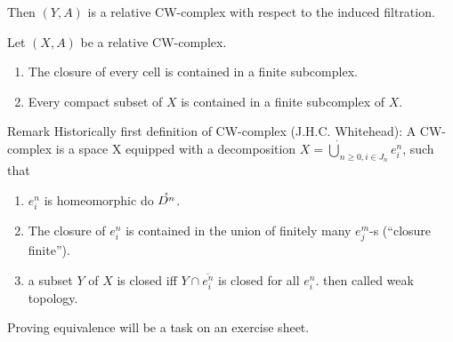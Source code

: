 \documentclass{TemplateLecture}
\begin{document}
Then \((Y,A)\) is a relative CW-complex with respect to the induced filtration.

\begin{thm}{}{}
    Let \((X,A)\) be a relative CW-complex.
    \begin{enumerate}
        \item The closure of every cell is contained in a finite subcomplex.
        \item Every compact subset of \(X\) is contained in a finite subcomplex of \(X\).
    \end{enumerate}
\end{thm}

Remark Historically first definition of CW-complex (J.H.C. Whitehead): A CW-complex is a space X equipped with a decomposition \(X = \dot\bigcup_{n \geq 0, i \in J_n} e_i^n\), such that
\begin{enumerate}
    \item \(e_i^n\) is homeomorphic do \(\mathring{D^n}\).
    \item The closure of \(e_i^n\) is contained in the union of finitely many \(e^m_j\)-s (\enquote{closure finite}).
    \item a subset \(Y\) of \(X\) is closed iff \(Y \cap \overline{e_i^n}\) is closed for all \(e_i^n\). then called weak topology.
\end{enumerate}
Proving equivalence will be a task on an exercise sheet.
\end{document}
